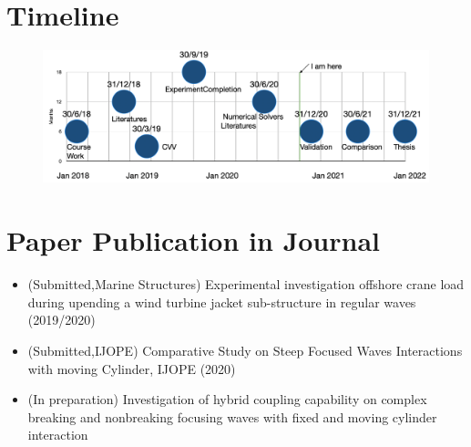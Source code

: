 \documentclass[preprint,12pt]{article}
\begin{document}
{\section{Timeline} 

\begin{figure} [H]
    \centering
    \includegraphics[width=\textwidth]{Timeline1.png}
    \label{Timeline}
\end{figure}






\section{Paper Publication in Journal}
\begin{itemize}
    \item (Submitted,Marine Structures) Experimental investigation offshore crane load during upending a wind turbine jacket sub-structure in regular waves (2019/2020)
    \item (Submitted,IJOPE) Comparative Study on Steep Focused Waves Interactions with moving Cylinder, IJOPE (2020)
    \item (In preparation) Investigation of hybrid coupling capability on complex breaking and nonbreaking focusing waves with fixed and moving cylinder interaction 
\end{itemize}




}
\end{document}
